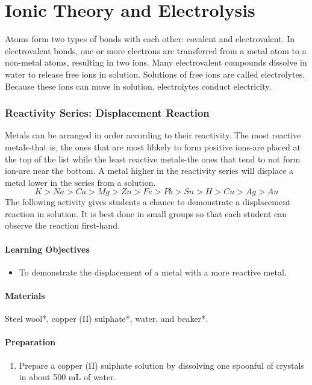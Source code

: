\chapter{Ionic Theory and Electrolysis}

Atoms form two types of bonds with each other: covalent and electrovalent. In electrovalent bonds, one or more electrons are transferred from a metal atom to a non-metal atoms, resulting in two ions. Many electrovalent compounds dissolve in water to release free ions in solution. Solutions of free ions are called electrolytes. Because these ions can move in solution, electrolytes conduct electricity.

\subsection{Reactivity Series: Displacement Reaction}

Metals can be arranged in order according to their reactivity. The most reactive metals-that is, the ones that are most lihkely to form positive ions-are placed at the top of the list while the least reactive metals-the ones that tend to not form ion-are near the bottom. A metal higher in the reactivity series will displace a metal lower in the series from a solution. 
$$K>Na>Ca>Mg>Zn>Fe>Pb>Sn>H>Cu>Ag>Au$$
The following activity gives students a chance to demonstrate a displacement reaction in solution. It is best done in small groups so that each student can observe the reaction first-hand.
\subsubsection*{Learning Objectives}
\begin{itemize}
\item{To demonstrate the displacement of a metal with a more reactive metal.}
\end{itemize}

\subsubsection*{Materials}
Steel wool*, copper (II) sulphate*, water, and beaker*.

\subsubsection*{Preparation}
\begin{enumerate}
\item{Prepare a copper (II) sulphate solution by dissolving one spoonful of crystals in about 500 mL of water.}
\end{enumerate}

